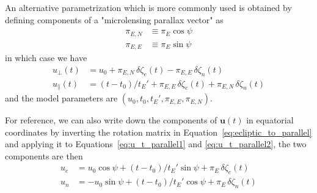\documentclass[12pt]{report}
\begin{document}
An alternative parametrization which is more commonly used is obtained by
defining components of a "microlensing parallax vector" as
\begin{align}
    \pi_{E,N} & \equiv \pi_E\cos\psi \\
    \pi_{E,E} & \equiv \pi_E\sin\psi
\end{align}
in which case we have
\begin{align}
    u_\bot(t)      & = u_0 + \pi_{E,N}\,\delta \zeta_e(t) - \pi_{E,E}\,\delta \zeta_n(t) \\
    u_\parallel(t) & =(t-t_0)/t_E' + \pi_{E,E}\,\delta\zeta_e(t) +
    \pi_{E,N}\,\delta\zeta_n(t)
\end{align}
and the model parameters are $\left(u_0,t_0,t_E',\pi_{E,E},\pi_{E,N}\right)$.

For reference, we can also write down the components of $\mathbf{u}(t)$ in
equatorial coordinates by inverting the rotation matrix in
Equation~\ref{eq:ecliptic_to_parallel} and applying it to
Equations~\ref{eq:u_t_parallel1} and \ref{eq:u_t_parallel2}, the two components
are then
\begin{align}
    u_e & =u_0\cos\psi + (t-t_0)/t_E'\sin\psi + \pi_E\,\delta\zeta_e(t)  \\
    u_n & =-u_0\sin\psi + (t-t_0)/t_E'\cos\psi + \pi_E\,\delta\zeta_n(t)
\end{align}
\end{document}

